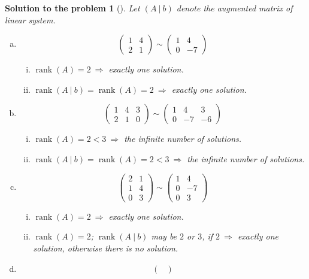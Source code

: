 \documentclass[12pt,a4]{article}
\newtheorem{solution}{Solution to the problem}
\newcommand\rank{\operatorname{rank}}
\begin{document}
\begin{solution}[]\rm Let $(A~|~b)$ denote the augmented matrix of linear system.
\begin{enumerate}[(a)]
\item
\[
\begin{pmatrix}
1 &   4 \\ 2 & 1
\end{pmatrix}
\sim
\begin{pmatrix}
1 &   4 \\ 0 & -7
\end{pmatrix}
\]
\begin{enumerate}[(i)]
\item $\rank(A)=2~\Rightarrow$ exactly one solution.
\item $\rank(A~|~b)=\rank(A)=2~\Rightarrow$ exactly one solution.
\end{enumerate}
\item
\[
\begin{pmatrix}
1 &  4  & 3\\ 2 & 1 & 0
\end{pmatrix}
\sim
\begin{pmatrix}
1 &  4  & 3\\ 0 & -7 & -6
\end{pmatrix}
\]
\begin{enumerate}[(i)]
\item $\rank(A)=2<3~\Rightarrow$ the infinite number of solutions.
\item $\rank(A~|~b)=\rank(A)=2<3~\Rightarrow$ the infinite number of solutions.
\end{enumerate}
\item
\[
\begin{pmatrix}
2 & 1 \\ 1 &  4 \\ 0 & 3
\end{pmatrix}
\sim
\begin{pmatrix}
1 & 4 \\ 0 &  -7 \\ 0 & 3
\end{pmatrix}
\]
\begin{enumerate}[(i)]
\item $\rank(A)=2~\Rightarrow$ exactly one solution.
\item $\rank(A)=2$; $\rank(A~|~b)$ may be $2$ or $3$, if $2~\Rightarrow$ exactly one solution, otherwise there is no solution.
\end{enumerate}
\item
\[
\begin{pmatrix}

\end{pmatrix}\]
\end{enumerate}
\end{solution}
\end{document}
